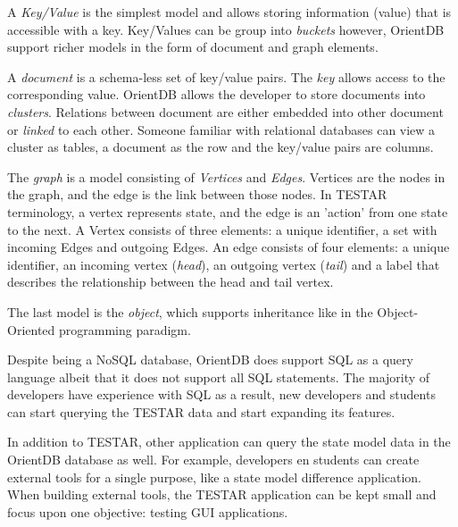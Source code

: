     A \hypertarget{db:key-value}{\emph{Key/Value}} is the simplest model and allows storing information (value) that is accessible with a key. Key/Values can be group into \textit{buckets} however, OrientDB support richer models in the form of document and graph elements. 

    A \hypertarget{db:document}{\emph{document}} is a schema-less set of key/value pairs. The \emph{key} allows access to the corresponding value. OrientDB allows the developer to store documents into \emph{clusters}. Relations between document are either embedded into other document or \emph{linked} to each other. Someone familiar with relational databases can view a cluster as tables, a document as the row and the key/value pairs are columns. 
    
    The \hypertarget{db:graph}{\emph{graph}} is a model consisting of \emph{Vertices} and \emph{Edges}. Vertices are the nodes in the graph, and the edge is the link between those nodes. In TESTAR terminology, a vertex represents state, and the edge is an 'action' from one state to the next. A Vertex consists of three elements: a unique identifier, a set with incoming Edges and outgoing Edges. An edge consists of four elements: a unique identifier, an incoming vertex (\emph{head}), an outgoing vertex (\emph{tail}) and a label that describes the relationship between the head and tail vertex. 

    The last model is the \hypertarget{db:object}{\emph{object}}, which supports inheritance like in the Object-Oriented programming paradigm.

    Despite being a NoSQL database, OrientDB does support SQL as a query language \cite{sql-lang} albeit that it does not support all SQL statements. The majority of developers have experience with SQL \cite{sql-stats} as a result, new developers and students can start querying the TESTAR data and start expanding its features.
    
    In addition to TESTAR, other application can query the state model data in the OrientDB database as well. For example, developers en students can create external tools for a single purpose, like a state model difference application. When building external tools, the TESTAR application can be kept small and focus upon one objective: testing GUI applications. 